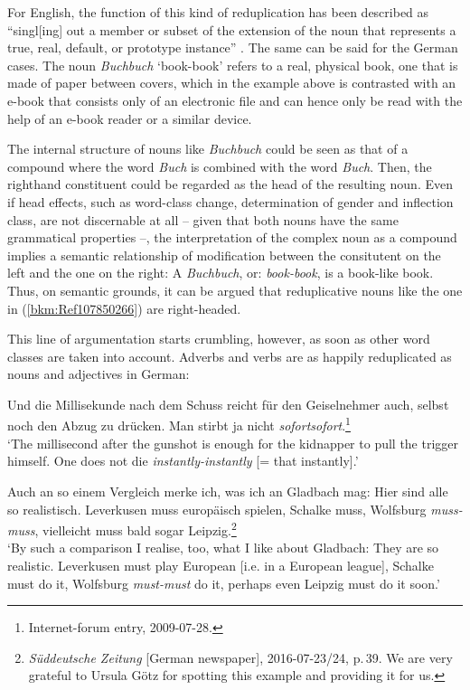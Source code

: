 \documentclass[output=paper
  ,nobabel
  ,draftmode
  ,colorlinks, citecolor=brown
]{langscibook}
\begin{document}
\noindent
For English, the function of this kind of reduplication has been described as ``singl[ing] out a
member or subset of the extension of the noun that represents a true, real, default, or prototype
instance'' \citep[48]{Horn1993}. The same can be said for the German cases. The noun \emph{Buchbuch}
`book-book' refers to a real, physical book, one that is made of paper between covers, which in the
example above is contrasted with an e-book that consists only of an electronic file and can hence
only be read with the help of an e-book reader or a similar device.

The internal structure of nouns like \emph{Buchbuch} could be seen as that of a compound where the
word \emph{Buch} is combined with the word \emph{Buch}. Then, the righthand constituent could be
regarded as the head of the resulting noun. Even if head effects, such as word-class change,
determination of gender and inflection class, are not discernable at all – given that both nouns
have the same grammatical properties –, the interpretation of the complex noun as a compound implies
a semantic relationship of modification between the consitutent on the left and the one on the
right: A \emph{Buchbuch}, or: \emph{book-book}, is a book-like book. Thus, on semantic grounds, it
can be argued that reduplicative nouns like the one in (\ref{bkm:Ref107850266}) are right-headed.

This line of argumentation starts crumbling, however, as soon as other word classes are taken into
account. Adverbs and verbs are as happily reduplicated as nouns and adjectives in German:

\ea
\label{bkm:Ref107864878}%
Und die Millisekunde nach dem Schuss reicht für den Geiselnehmer auch, selbst noch den Abzug zu drücken. Man stirbt ja nicht \emph{sofortsofort}.\footnote{Internet-forum entry, 2009-07-28.}\\
`The millisecond after the gunshot is enough for the kidnapper to pull the trigger himself. One does not die \emph{instantly-instantly} [= that instantly].'
\z

\ea
\label{bkm:Ref107850306}%
Auch an so einem Vergleich merke ich, was ich an Gladbach mag: Hier sind alle so realistisch. Leverkusen muss europäisch spielen, Schalke muss, Wolfsburg \emph{muss-muss}, vielleicht muss bald sogar Leipzig.\footnote{\emph{Süddeutsche Zeitung} [German newspaper], 2016-07-23/24, p.\,39. We are very grateful to Ursula Götz for spotting this example and providing it for us.}\\
`By such a comparison I realise, too, what I like about Gladbach: They are so realistic. Leverkusen must play European [i.e. in a European league], Schalke must do it, Wolfsburg \emph{must-must} do it, perhaps even Leipzig must do it soon.'
\z
\end{document}
